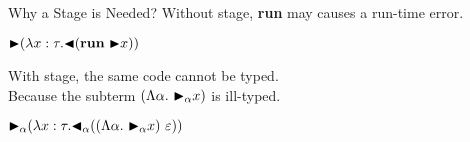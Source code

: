 \documentclass[dvipdfmx,aspectratio=169, 20pt]{beamer}
\renewcommand{\V}{\vdash}
\begin{document}
\begin{frame}[fragile]{Why a Stage is Needed?}
    Without stage, \textbf{run} may causes a run-time error.
    \begin{exampleblock}{}
        \begin{center}
    \( \TB (\lambda x:\tau. \TBL (\textbf{run}\ \TB x)) \)
        \end{center}
    \end{exampleblock}

    With stage, the same code cannot be typed.\\
    Because the subterm \( (\Lambda\alpha.\ \TB_\alpha x) \) is ill-typed.
    \begin{exampleblock}{}
        \begin{center}
    \( {\mathop{\blacktriangleright}}_\alpha (\lambda x:\tau. {\mathop{\blacktriangleleft}}_\alpha ((\Lambda\alpha.\ {\mathop{\blacktriangleright}}_\alpha x)\ \varepsilon)) \)
        \end{center}
    \end{exampleblock}
\end{frame}


\end{document}

